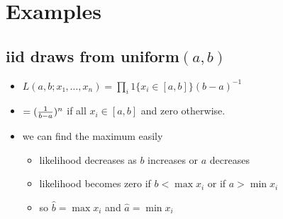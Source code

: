 \section{Examples}

\subsection{iid draws from uniform$(a,b)$}
\begin{itemize}
\item $L(a,b; x₁,…,x_n) = ∏_i 1\{x_i ∈ [a,b]\} (b-a)^{-1}$
\item $= ({1 \over b-a})^{n}$ if all $x_i ∈ [a,b]$ and zero otherwise.
\item we can find the maximum easily
  \begin{itemize}
  \item likelihood decreases as $b$ increases or $a$ decreases
  \item likelihood becomes zero if $b < \max x_i$ or if $a > \min x_i$
  \item so $\hat b = \max x_i$ and $\hat a = \min x_i$
  \end{itemize}
\end{itemize}

